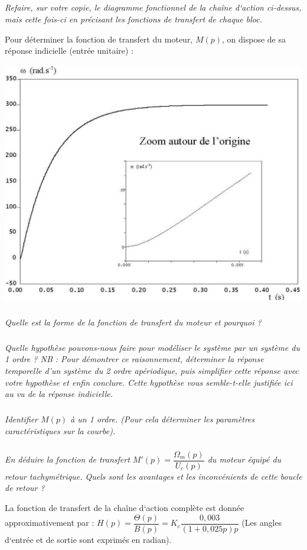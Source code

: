 \documentclass[10pt,fleqn]{article} %
\begin{document}
\begin{multicols}{2}
\subparagraph{}
\textit{Refaire, sur votre copie, le diagramme fonctionnel de la chaîne d‘action
ci-dessus, mais cette fois-ci en précisant les fonctions de transfert de chaque
bloc.}

Pour déterminer la fonction de transfert du moteur, $M(p)$, on dispose de sa
réponse indicielle (entrée unitaire) :

\begin{center}
 \includegraphics[width=.9\linewidth]{images/image1_5}
\end{center}

\subparagraph{}
\textit{Quelle est la forme de la fonction de transfert du moteur et pourquoi ?}

\subparagraph{}
\textit{Quelle hypothèse pouvons-nous faire pour modéliser le système par un
système du 1
ordre ?
NB : Pour démontrer ce raisonnement, déterminer la réponse temporelle d’un
système
du 2 ordre apériodique, puis simplifier cette réponse avec votre
hypothèse et enfin
conclure.
Cette hypothèse vous semble-t-elle justifiée ici au vu de la réponse indicielle.
}

\subparagraph{}
\textit{Identifier $M(p)$ à un 1 ordre. (Pour cela déterminer les
paramètres caractéristiques sur la courbe).}

\subparagraph{}
\textit{En déduire la fonction de transfert $M'(p)=\dfrac{\Omega_m(p)}{U_c(p)}$
du moteur équipé du retour                                                 
tachymétrique. Quels sont les avantages et les inconvénients de cette boucle de
retour ?}

La fonction de transfert de la chaîne d‘action complète est donnée
approximativement par :
$H(p)=\dfrac{\Theta(p)}{B(p)}=K_c\dfrac{0,003}{\left(1+0,025p \right)p}$    
(Les angles d‘entrée et de sortie sont exprimés en radian).


\end{multicols}
\end{document}
